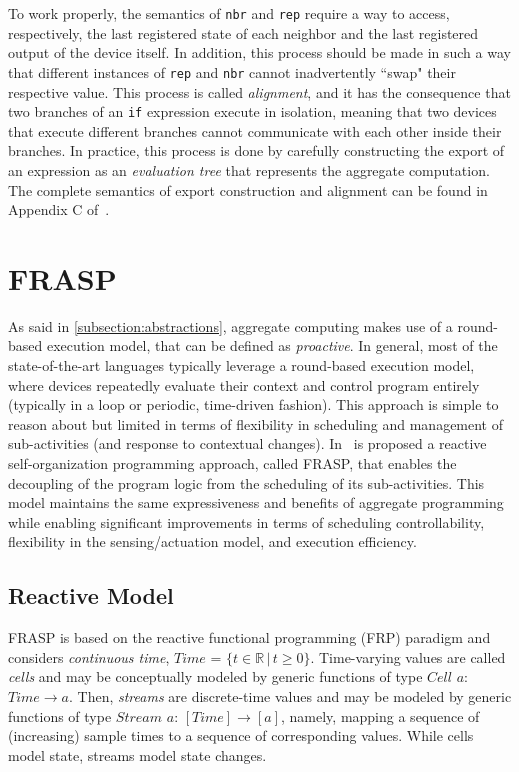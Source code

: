 \documentclass[12pt,a4paper,openright,twoside]{book}
\begin{document}
To work properly, the semantics of \texttt{nbr} and \texttt{rep} require a way to access, respectively, the last registered state of each neighbor and the last registered output of the device itself. In addition, this process should be made in such a way that different instances of \texttt{rep} and \texttt{nbr} cannot inadvertently ``swap" their respective value. This process is called \textit{alignment}, and it has the consequence that two branches of an \texttt{if} expression execute in isolation, meaning that two devices that execute different branches cannot communicate with each other inside their branches. In practice, this process is done by carefully constructing the export of an expression as an \textit{evaluation tree} that represents the aggregate computation. The complete semantics of export construction and alignment can be found in Appendix C of~\cite{Viroli2018}.

\section{FRASP}

As said in \cref{subsection:abstractions}, aggregate computing makes use of a round-based execution model, that can be defined as \textit{proactive}. In general, most of the state-of-the-art languages typically leverage a round-based execution model, where devices repeatedly evaluate their context and control program entirely (typically in a loop or periodic, time-driven fashion). This approach is simple to reason about but limited in terms of flexibility in
scheduling and management of sub-activities (and response to contextual changes). In~\cite{Casadei2023} is proposed a reactive self-organization programming approach, called FRASP, that enables the decoupling of the program logic from the scheduling of its sub-activities. This model maintains the same expressiveness and benefits of aggregate programming while enabling significant improvements in terms of scheduling controllability, flexibility in the sensing/actuation model, and execution efficiency.

\subsection{Reactive Model}
FRASP is based on the reactive functional programming (FRP) paradigm and considers \textit{continuous time}, $Time$ = $\{ t \in \mathbb{R} \, | \, t \geq 0 \}$. Time-varying values are called \textit{cells} and may be conceptually modeled by generic functions of type $Cell$ $a$: $Time \rightarrow a$. Then, \textit{streams} are discrete-time values and may be modeled by generic functions of type $Stream$ $a$: $[Time] \rightarrow [a]$, namely, mapping a sequence of (increasing) sample times to a sequence of corresponding values. While cells model state, streams model state changes.
\end{document}

